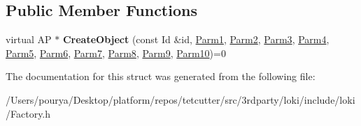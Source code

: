 \subsection*{Public Member Functions}
\begin{DoxyCompactItemize}
\item 
\hypertarget{structLoki_1_1FactoryImpl_3_01AP_00_01Id_00_01Seq_3_01P1_00_01P2_00_01P3_00_01P4_00_01P5_00_01P623d57a0b18074641c8bca6ad36c44171_a0bb0ede6137a22103869feb5701dbf2f}{}virtual A\+P $\ast$ {\bfseries Create\+Object} (const Id \&id, \hyperlink{classLoki_1_1EmptyType}{Parm1}, \hyperlink{classLoki_1_1EmptyType}{Parm2}, \hyperlink{classLoki_1_1EmptyType}{Parm3}, \hyperlink{classLoki_1_1EmptyType}{Parm4}, \hyperlink{classLoki_1_1EmptyType}{Parm5}, \hyperlink{classLoki_1_1EmptyType}{Parm6}, \hyperlink{classLoki_1_1EmptyType}{Parm7}, \hyperlink{classLoki_1_1EmptyType}{Parm8}, \hyperlink{classLoki_1_1EmptyType}{Parm9}, \hyperlink{classLoki_1_1EmptyType}{Parm10})=0\label{structLoki_1_1FactoryImpl_3_01AP_00_01Id_00_01Seq_3_01P1_00_01P2_00_01P3_00_01P4_00_01P5_00_01P623d57a0b18074641c8bca6ad36c44171_a0bb0ede6137a22103869feb5701dbf2f}

\end{DoxyCompactItemize}


The documentation for this struct was generated from the following file\+:\begin{DoxyCompactItemize}
\item 
/\+Users/pourya/\+Desktop/platform/repos/tetcutter/src/3rdparty/loki/include/loki/Factory.\+h\end{DoxyCompactItemize}
